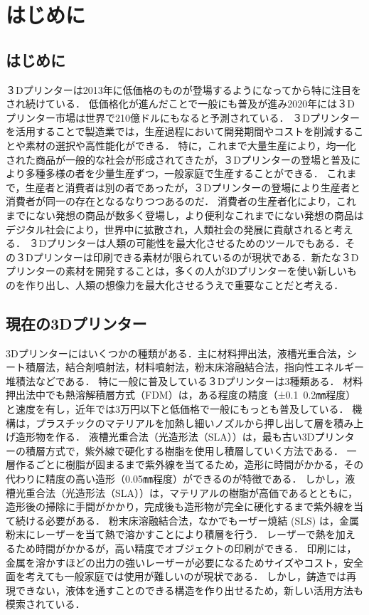 \chapter{はじめに}
\label{chp:first1}

\section{はじめに}
\label{sec:paragraph}

３Dプリンターは2013年に低価格のものが登場するようになってから特に注目をされ続けている．
低価格化が進んだことで一般にも普及が進み2020年には３Dプリンター市場は世界で210億ドルにもなると予測されている．
３Dプリンターを活用することで製造業では，生産過程において開発期間やコストを削減することや素材の選択や高性能化ができる．
特に，これまで大量生産により，均一化された商品が一般的な社会が形成されてきたが，３Dプリンターの登場と普及により多種多様の者を少量生産ずつ，一般家庭で生産することができる．
これまで，生産者と消費者は別の者であったが，３Dプリンターの登場により生産者と消費者が同一の存在となるなりつつあるのだ． 消費者の生産者化により，これまでにない発想の商品が数多く登場し，より便利なこれまでにない発想の商品はデジタル社会により，世界中に拡散され，人類社会の発展に貢献されると考える．
３Dプリンターは人類の可能性を最大化させるためのツールでもある．その３Dプリンターは印刷できる素材が限られているのが現状である．新たな３Dプリンターの素材を開発することは，多くの人が3Dプリンターを使い新しいものを作り出し、人類の想像力を最大化させるうえで重要なことだと考える．


\section{現在の3Dプリンター}
\label{sec:paragraph}

3Dプリンターにはいくつかの種類がある．主に材料押出法，液槽光重合法，シート積層法，結合剤噴射法，材料噴射法，粉末床溶融結合法，指向性エネルギー堆積法などである．
特に一般に普及している３Dプリンターは3種類ある．
材料押出法中でも熱溶解積層方式（FDM）は，ある程度の精度（±0.1~0.2㎜程度）と速度を有し，近年では3万円以下と低価格で一般にもっとも普及している．
機構は，プラスチックのマテリアルを加熱し細いノズルから押し出して層を積み上げ造形物を作る．
液槽光重合法（光造形法（SLA））は，最も古い3Dプリンターの積層方式で，紫外線で硬化する樹脂を使用し積層していく方法である．
一層作るごとに樹脂が固まるまで紫外線を当てるため，造形に時間がかかる，その代わりに精度の高い造形（0.05㎜程度）ができるのが特徴である．
しかし，液槽光重合法（光造形法（SLA））は，マテリアルの樹脂が高価であるとともに，造形後の掃除に手間がかかり，完成後も造形物が完全に硬化するまで紫外線を当て続ける必要がある．
粉末床溶融結合法，なかでもーザー焼結 (SLS) は，金属粉末にレーザーを当て熱で溶かすことにより積層を行う．
レーザーで熱を加えるため時間がかかるが，高い精度でオブジェクトの印刷ができる．
印刷には，金属を溶かすほどの出力の強いレーザーが必要になるためサイズやコスト，安全面を考えても一般家庭では使用が難しいのが現状である．
しかし，鋳造では再現できない，液体を通すことのできる構造を作り出せるため，新しい活用方法も模索されている．

